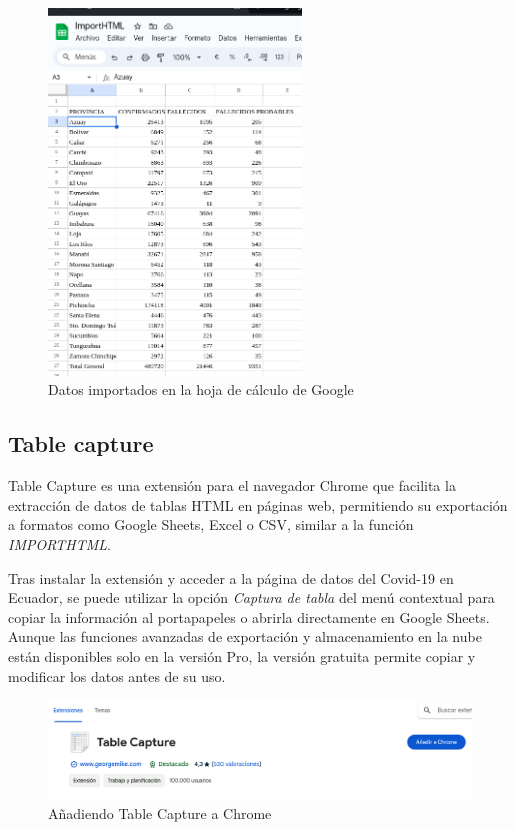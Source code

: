 \documentclass[12pt]{article}
\begin{document}
                        \begin{figure}[!h]
                                \centering
                                \includegraphics[width=0.6\textwidth]{img/importhtml-3.png}
                                \caption{Datos importados en la hoja de cálculo de Google}
                        \end{figure}

                \subsection{Table capture}
                        Table Capture es una extensión para el navegador Chrome que facilita la extracción de datos de tablas HTML en páginas web, permitiendo su exportación a formatos como Google Sheets, Excel o CSV, similar a la función \textit{IMPORTHTML}. 
                        
                        Tras instalar la extensión y acceder a la página de datos del Covid-19 en Ecuador, se puede utilizar la opción \textit{Captura de tabla} del menú contextual para copiar la información al portapapeles o abrirla directamente en Google Sheets. Aunque las funciones avanzadas de exportación y almacenamiento en la nube están disponibles solo en la versión Pro, la versión gratuita permite copiar y modificar los datos antes de su uso.
                        
                        \begin{figure}[!h]
                                \centering
                                \includegraphics[width=1\textwidth]{img/tablecapture-1.png}
                                \caption{Añadiendo Table Capture a Chrome}
                        \end{figure}
\end{document}
